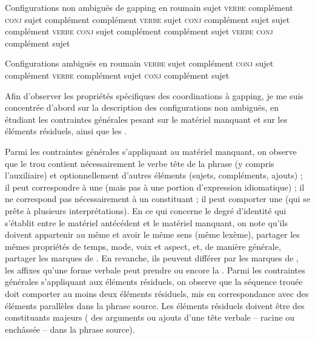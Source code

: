 \ea \label{ch2:ex330}
Configurations non ambiguës de gapping en roumain 
\ea sujet \textsc{verbe} complément \textsc{conj} sujet complément \label{ch2:ex330a}
\ex complément \textsc{verbe} sujet \textsc{conj} complément sujet \label{ch2:ex330b}
\ex sujet complément \textsc{verbe} \textsc{conj} sujet complément \label{ch2:ex330c}
\ex complément sujet \textsc{verbe} \textsc{conj} complément sujet \label{ch2:ex330d}
\z
\z

\ea \label{ch2:ex331}
Configurations ambiguës en roumain 
\ea \textsc{verbe} sujet complément \textsc{conj} sujet complément \label{ch2:ex331a}
\ex \textsc{verbe} complément sujet \textsc{conj} complément sujet \label{ch2:ex331b}
\z
\z

Afin d’observer les propriétés spécifiques des coordinations à gapping, je me suis concentrée d’abord sur la description des configurations non ambiguës, en étudiant les contraintes générales pesant sur le matériel manquant et sur les éléments résiduels, ainsi que les .

Parmi les contraintes générales s’appliquant au matériel manquant, on observe que le trou contient nécessairement le verbe tête de la phrase (y compris l’auxiliaire) et optionnellement d’autres éléments (sujets, compléments, ajouts) ; il peut correspondre à une  (mais pas à une portion d’expression idiomatique) ; il ne correspond pas nécessairement à un constituant ; il peut comporter une  (qui se prête à plusieurs interprétations). En ce qui concerne le degré d’identité qui s’établit entre le matériel antécédent et le matériel manquant, on note qu’ils doivent appartenir au même  et avoir le même sens (même lexème), partager les mêmes propriétés de temps, mode, voix et aspect, et, de manière générale, partager les marques de . En revanche, ils peuvent différer par les marques de , les affixes qu’une forme verbale peut prendre ou encore la . Parmi les contraintes générales s’appliquant aux éléments résiduels, on observe que la séquence trouée doit comporter au moins deux éléments résiduels, mis en correspondance avec des éléments parallèles dans la phrase source. Les éléments résiduels doivent être des constituants majeurs ({\cad} des arguments ou ajouts d’une tête verbale – racine ou enchâssée – dans la phrase source). 

